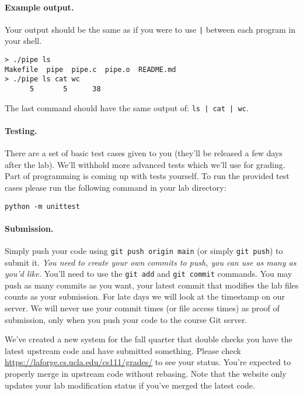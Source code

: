 \paragraph{Example output.}
Your output should be the same as if you were to use \texttt{|} between each
program in your shell.

\begin{lstlisting}
> ./pipe ls
Makefile  pipe	pipe.c	pipe.o	README.md
> ./pipe ls cat wc
      5       5      38
\end{lstlisting}

The last command should have the same output of: \texttt{ls | cat | wc}.

\paragraph{Testing.}

There are a set of basic test cases given to you (they'll be released a few
days after the lab).
We'll withhold more advanced tests which we'll use for grading.
Part of programming is coming up with tests yourself.
To run the provided test cases please run the following command in your lab
directory:

\begin{lstlisting}[xleftmargin=2em]
python -m unittest
\end{lstlisting}

\paragraph{Submission.}

Simply push your code using \lstinline|git push origin main| (or simply
\lstinline|git push|) to submit it.
\textit{You need to create your own commits to push, you can use as many
as you'd like.}
You'll need to use the \texttt{git add} and \texttt{git commit} commands.
You may push as many commits as you want, your latest commit that modifies
the lab files counts as your submission.
For late days we will look at the timestamp on our server.
We will never use your commit times (or file access times) as proof of
submission, only when you push your code to the course Git server.

We've created a new system for the fall quarter that double checks you
have the latest upstream code and have submitted something.
Please check
\url{https://laforge.cs.ucla.edu/cs111/grades/}
to see your status.
You're expected to properly merge in upstream code without rebasing.
Note that the website only updates your lab modification status
if you've merged the latest code.


